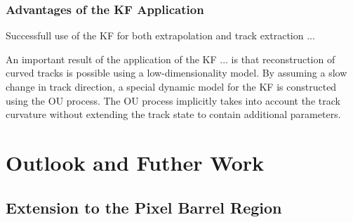\subsubsection{Advantages of the KF Application}
Successfull use of the KF for both extrapolation and track extraction ...

An important result of the application of the KF ... is that reconstruction of curved tracks is possible using a low-dimensionality model. By assuming a slow change in track direction, a special dynamic model for the KF is constructed using the OU process. The OU process implicitly takes into account the track curvature without extending the track state to contain additional parameters.







\section{Outlook and Futher Work}
\label{chapter-7-outlook}

\subsection{Extension to the Pixel Barrel Region}



